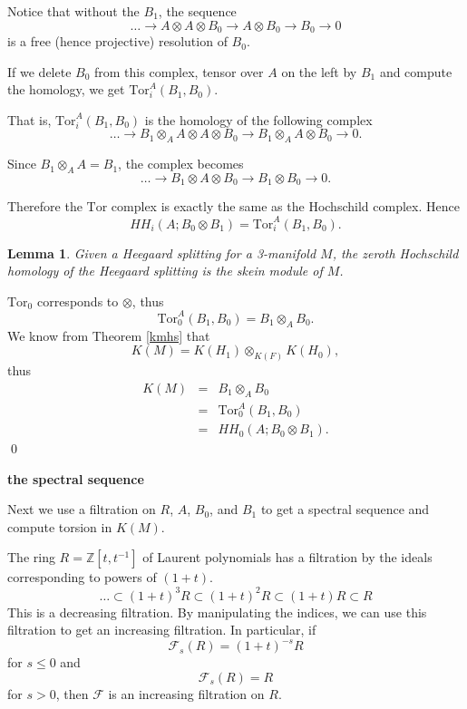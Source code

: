 \documentclass{slides}
\newcommand{\ot}{\otimes}
\newtheorem{lemma}{Lemma}
\theoremstyle{definition}
\begin{document}
\begin{slide}
Notice that without the $B_1$, the sequence
$$\dots \to A \ot A \ot B_0 \to
A \ot B_0 \to B_0 \to 0$$ is a free (hence projective) resolution of $B_0$.

If we delete $B_0$ from this complex, tensor over $A$ on the left by $B_1$
and compute the homology, we get $\mathrm{Tor}_i^A(B_1, B_0)$.

That is, $\mathrm{Tor}_i^A(B_1,B_0)$ is the homology of the following complex
$$\dots \to B_1 \ot_A
A \ot A \ot B_0 \to B_1 \ot_A A \ot B_0 \to 0.$$

Since $B_1 \ot_A A = B_1$, the complex becomes
$$\dots \to B_1 \ot A \ot B_0
\to B_1 \ot B_0 \to 0.$$

Therefore the $\mathrm{Tor}$ complex is exactly the same as the
Hochschild complex.  Hence
\[HH_i(A; B_0 \ot B_1) = \mathrm{Tor}_i^A(B_1, B_0).\]
\end{slide}

\begin{slide}
\begin{lemma}
Given a Heegaard splitting for a 3-manifold $M$,
the zeroth Hochschild homology of the Heegaard splitting
is the skein module of $M$.
\end{lemma}

\proof
$\mathrm{Tor}_0$ corresponds to $\ot$, thus
$$\mathrm{Tor}_0^A(B_1, B_0) = B_1 \ot_A B_0.$$
We know from Theorem \ref{kmhs} that $$K(M) = K(H_1) \ot_{K(F)} K(H_0),$$ thus
\begin{eqnarray}
K(M) & = & B_1 \ot_A B_0 \nonumber \\
& = & \mathrm{Tor}_0^A(B_1, B_0) \nonumber \\
& = & HH_0(A; B_0 \ot B_1). \nonumber
\end{eqnarray}
\qed
\end{slide}

\begin{slide}
\textbf{the spectral sequence}

Next we use a filtration on $R$, $A$, $B_0$, and $B_1$ to get a
spectral sequence and compute torsion in $K(M)$.

The ring $R = \mathbb{Z}[t,t^{-1}]$ of Laurent polynomials has a
filtration by the ideals corresponding to powers of $(1+t)$.
\[\dots \subset (1+t)^3 R \subset (1+t)^2 R \subset (1+t) R \subset R\]
This is a decreasing filtration.  By manipulating the indices, we can
use this filtration to get an increasing filtration.  In particular, if
$$\mathcal{F}_s(R) = (1+t)^{-s} R$$ for $s \leq 0$ and
$$\mathcal{F}_s(R) = R$$ for $s > 0$, then $\mathcal{F}$ is
an increasing filtration on $R$.
\end{slide}
\end{document}

